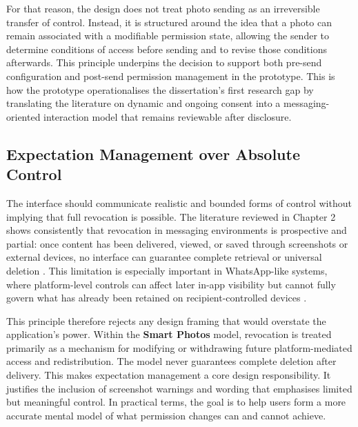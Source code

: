For that reason, the design does not treat photo sending as an irreversible transfer of control. Instead, it is structured around the idea that a photo can remain associated with a modifiable permission state, allowing the sender to determine conditions of access before sending and to revise those conditions afterwards. This principle underpins the decision to support both pre-send configuration and post-send permission management in the prototype. This is how the prototype operationalises the dissertation's first research gap by translating the literature on dynamic and ongoing consent into a messaging-oriented interaction model that remains reviewable after disclosure.

\subsection{Expectation Management over Absolute Control}
The interface should communicate realistic and bounded forms of control without implying that full revocation is possible. The literature reviewed in Chapter 2 shows consistently that revocation in messaging environments is prospective and partial: once content has been delivered, viewed, or saved through screenshots or external devices, no interface can guarantee complete retrieval or universal deletion \cite{politou_2018,schnitzler_2020,heath_2023,ingber_2025}. This limitation is especially important in WhatsApp-like systems, where platform-level controls can affect later in-app visibility but cannot fully govern what has already been retained on recipient-controlled devices \cite{whatsapp_delete_messages,whatsapp_disappearing_messages,whatsapp_view_once}.

This principle therefore rejects any design framing that would overstate the application's power. Within the \textbf{Smart Photos} model, revocation is treated primarily as a mechanism for modifying or withdrawing future platform-mediated access and redistribution. The model never guarantees complete deletion after delivery. This makes expectation management a core design responsibility. It justifies the inclusion of screenshot warnings and wording that emphasises limited but meaningful control. In practical terms, the goal is to help users form a more accurate mental model of what permission changes can and cannot achieve. 

